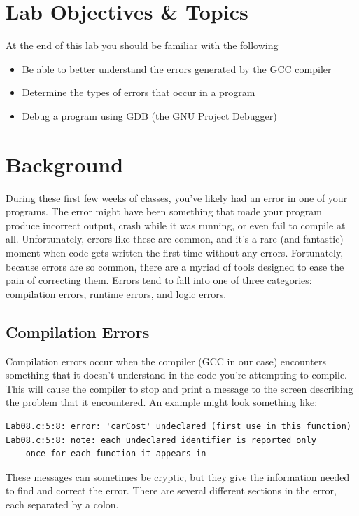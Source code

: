 \documentclass[12pt]{scrartcl}
\begin{document}
\section{Lab Objectives \& Topics}
At the end of this lab you should be familiar with the following
\begin{itemize}
  \item Be able to better understand the errors generated by the GCC compiler
  \item Determine the types of errors that occur in a program
  \item Debug a program using GDB (the GNU Project Debugger)
\end{itemize}

\section{Background}

During these first few weeks of classes, you've likely had an error in 
one of your programs.  The error might have been something that 
made your program produce incorrect output, crash while it was 
running, or even fail to compile at all.  Unfortunately, errors like these 
are common, and it's a rare (and fantastic) moment when code gets 
written the first time without any errors.  Fortunately, because errors 
are so common, there are a myriad of tools designed to ease the 
pain of correcting them.  Errors tend to fall into one of three categories: 
compilation errors, runtime errors, and logic errors.  

\subsection*{Compilation Errors}

Compilation errors occur when the compiler (GCC in our case) 
encounters something that it doesn't understand in the code you're 
attempting to compile.  This will cause the compiler to stop and print 
a message to the screen describing the problem that it encountered.  
An example might look something like:

\begin{verbatim}
Lab08.c:5:8: error: 'carCost' undeclared (first use in this function)
Lab08.c:5:8: note: each undeclared identifier is reported only 
	once for each function it appears in
\end{verbatim}

These messages can sometimes be cryptic, but they give the 
information needed to find and correct the error. There are several 
different sections in the error, each separated by a colon.
\end{document}
